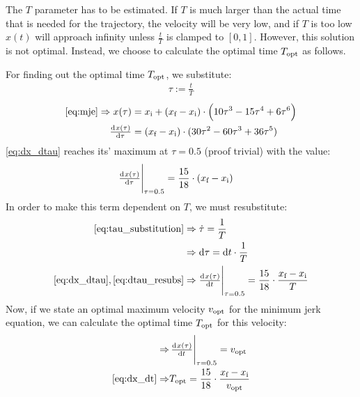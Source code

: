 \documentclass[11pt]{article}
\begin{document}
The $T$ parameter has to be estimated. If $T$ is much larger than  the actual time that is needed for the trajectory, the velocity will be very low, and if $T$ is too low $x(t)$ will approach infinity unless $\frac{t}{T}$ is clamped to $[0,1]$. However, this solution is not optimal. Instead, we choose to calculate the optimal time $T_\textup{opt}$ as follows.%
\par
For finding out the optimal time $T_\textup{opt}$, we substitute:
\begin{align}
  \label{eq:tau_substitution}
  \tau:=\frac{t}{T}
\end{align}\vspace{-26pt}
\begin{align}
\ref{eq:mje}\Rightarrow x(\tau)&= \di{x}{i} +  (\di{x}{f} - \di{x}{i}) \cdot \left(10\tau^3 - 15\tau^4 + 6\tau^6 \right)\\
\od{x(\tau)}{\tau}&= (\di{x}{f} - \di{x}{i})\cdot(30\tau^2-60\tau^3+36\tau^5)\label{eq:dx_dtau}
\end{align}
\ref{eq:dx_dtau} reaches its' maximum at $\tau=0.5$ (proof trivial) with the value:
\begin{align}
  \eval{\od{x(\tau)}{\tau}}_{\tau=0.5}&=\frac{15}{18}\cdot(\di{x}{f} - \di{x}{i})
\end{align}
In order to make this term dependent on $T$, we must resubstitute:
\begin{align}
  \ref{eq:tau_substitution}&\Rightarrow %
\dot{\tau}
=\frac{1}{T}\\
  &\Rightarrow\dif\tau=\dif t\cdot\frac{1}{T}\label{eq:dtau_resubs}\\
  \ref{eq:dx_dtau},\ref{eq:dtau_resubs}&\Rightarrow%
\eval{\od{x(\tau)}{t}}
_{\tau=0.5}=\frac{15}{18}\cdot\frac{\di{x}{f} - \di{x}{i}}{T}\label{eq:dx_dt}
\end{align}
Now, if we state an optimal maximum velocity $v_\textup{opt}$ for the minimum jerk equation, we can calculate the optimal time $T_\textup{opt}$ for this velocity:
\begin{align}
  \Rightarrow&\eval{\od{x(\tau)}{t}}_{\tau=0.5}=\di{v}{opt}\\
  \ref{eq:dx_dt}\Rightarrow& \di{T}{opt}=\frac{15}{18}\cdot\frac{\di{x}{f} - \di{x}{i}}{\di{v}{opt}}
\end{align}
\par
\end{document}
